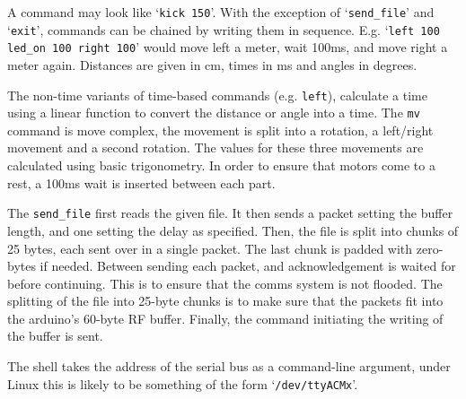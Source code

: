 \documentclass[a4paper]{scrartcl}
\begin{document}
A command may look like `\verb$kick 150$'. With the exception of
`\verb$send_file$' and `\verb$exit$', commands can be chained by writing them
in sequence. E.g.  `\texttt{left 100 led\_on 100 right 100}' would move left a
meter, wait 100ms, and move right a meter again. Distances are given in cm,
times in ms and angles in degrees.

The non-time variants of time-based commands (e.g. \verb$left$), calculate a
time using a linear function to convert the distance or angle into a time. The
\verb$mv$ command is move complex, the movement is split into a rotation, a
left/right movement and a second rotation. The values for these three movements
are calculated using basic trigonometry. In order to ensure that motors come to
a rest, a 100ms wait is inserted between each part.

The \verb$send_file$ first reads the given file. It then sends a packet setting
the buffer length, and one setting the delay as specified. Then, the file is
split into chunks of 25 bytes, each sent over in a single packet. The last
chunk is padded with zero-bytes if needed. Between sending each packet, and
acknowledgement is waited for before continuing. This is to ensure that the
comms system is not flooded. The splitting of the file into 25-byte chunks is
to make sure that the packets fit into the arduino's 60-byte RF buffer.
Finally, the command initiating the writing of the buffer is sent.

The shell takes the address of the serial bus as a command-line argument, under
Linux this is likely to be something of the form `\verb$/dev/ttyACMx$'.
\end{document}
